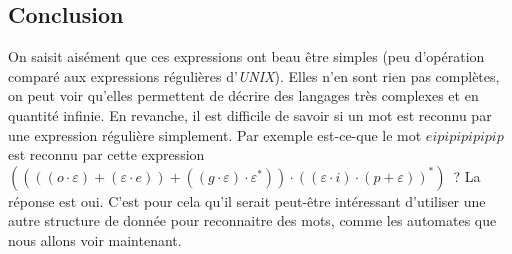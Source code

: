 \vphantom{}

\subsection{Conclusion}

On saisit aisément que ces expressions ont beau être simples (peu d'opération
comparé aux expressions régulières d'\textit{UNIX}). Elles n'en sont rien pas
complètes, on peut voir qu'elles permettent de décrire des langages très
complexes et en quantité infinie. En revanche, il est difficile de savoir si un
mot est reconnu par une expression régulière simplement. Par exemple est-ce-que
le mot \(eipipipipipip\) est reconnu par cette expression \(((((o \cdot
\varepsilon)+(\varepsilon \cdot e))+((g\cdot \varepsilon) \cdot \varepsilon^*))
\cdot ((\varepsilon \cdot i)\cdot (p+\varepsilon))^*)\)~? La réponse est oui.
C'est pour cela qu'il serait peut-être intéressant d'utiliser une autre
structure de donnée pour reconnaitre des mots, comme les automates que nous
allons voir maintenant.